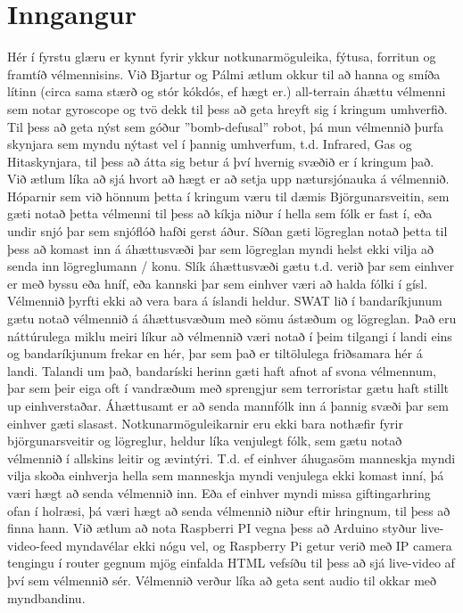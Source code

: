 \section{Inngangur}
Hér í fyrstu glæru er kynnt fyrir ykkur notkunarmöguleika, fýtusa, forritun og framtíð vélmennisins.
Við Bjartur og Pálmi ætlum okkur til að hanna og smíða lítinn (circa sama stærð og stór kókdós, ef hægt er.) all-terrain áhættu vélmenni sem notar gyroscope og tvö dekk til þess að geta hreyft sig í kringum umhverfið. Til þess að geta nýst sem góður ”bomb-defusal” robot, þá mun vélmennið þurfa skynjara sem myndu nýtast vel í þannig umhverfum, t.d. Infrared, Gas og Hitaskynjara, til þess að átta sig betur á því hvernig svæðið er í kringum það. Við ætlum líka að sjá hvort að hægt er að setja upp nætursjónauka á vélmennið.
Hóparnir sem við hönnum þetta í kringum væru til dæmis Björgunarsveitin, sem gæti notað þetta vélmenni til þess að kíkja niður í hella sem fólk er fast í, eða undir snjó þar sem snjóflóð hafði gerst áður.
Síðan gæti lögreglan notað þetta til þess að komast inn á áhættusvæði þar sem lögreglan myndi helst ekki vilja að senda inn lögreglumann / konu. Slík áhættusvæði gætu t.d. verið þar sem einhver er með byssu eða hníf, eða kannski þar sem einhver væri að halda fólki í gísl.
Vélmennið þyrfti ekki að vera bara á íslandi heldur. SWAT lið í bandaríkjunum gætu notað vélmennið á áhættusvæðum með sömu ástæðum og lögreglan. Það eru náttúrulega miklu meiri líkur að vélmennið væri notað í þeim tilgangi í landi eins og bandaríkjunum frekar en hér, þar sem það er tiltölulega friðsamara hér á landi.
Talandi um það, bandaríski herinn gæti haft afnot af svona vélmennum, þar sem þeir eiga oft í vandræðum með sprengjur sem terroristar gætu haft stillt up einhverstaðar. Áhættusamt er að senda mannfólk inn á þannig svæði þar sem einhver gæti slasast.
Notkunarmöguleikarnir eru ekki bara nothæfir fyrir björgunarsveitir og lögreglur, heldur líka venjulegt fólk, sem gætu notað vélmennið í allskins leitir og ævintýri. T.d. ef einhver áhugasöm manneskja myndi vilja skoða einhverja hella sem manneskja myndi venjulega ekki komast inní, þá væri hægt að senda vélmennið inn. Eða ef einhver myndi missa giftingarhring ofan í holræsi, þá væri hægt að senda vélmennið niður eftir hringnum, til þess að finna hann. 
Við ætlum að nota Raspberri PI vegna þess að Arduino styður live-video-feed myndavélar ekki nógu vel, og Raspberry Pi getur verið með IP camera tengingu í router gegnum mjög einfalda HTML vefsíðu til þess að sjá live-video af því sem vélmennið sér. Vélmennið verður líka að geta sent audio til okkar með myndbandinu. 
